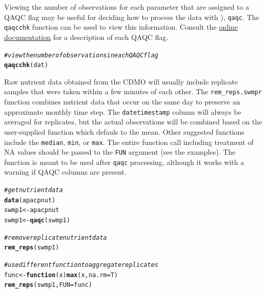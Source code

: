 \documentclass[10pt,letterpaper]{article}\usepackage[]{graphicx}\usepackage[]{color}
\makeatletter
\newcommand{\hlcom}[1]{\textcolor[rgb]{0.678,0.584,0.686}{\textit{#1}}}%
\newcommand{\hlstd}[1]{\textcolor[rgb]{0.345,0.345,0.345}{#1}}%
\newcommand{\hlkwa}[1]{\textcolor[rgb]{0.161,0.373,0.58}{\textbf{#1}}}%
\newcommand{\hlkwb}[1]{\textcolor[rgb]{0.69,0.353,0.396}{#1}}%
\newcommand{\hlkwc}[1]{\textcolor[rgb]{0.333,0.667,0.333}{#1}}%
\newcommand{\hlkwd}[1]{\textcolor[rgb]{0.737,0.353,0.396}{\textbf{#1}}}%
\newenvironment{kframe}{%
 \def\at@end@of@kframe{}%
 \ifinner\ifhmode%
  \def\at@end@of@kframe{\end{minipage}}%
  \begin{minipage}{\columnwidth}%
 \fi\fi%
 \def\FrameCommand##1{\hskip\@totalleftmargin \hskip-\fboxsep
 \colorbox{shadecolor}{##1}\hskip-\fboxsep
     \hskip-\linewidth \hskip-\@totalleftmargin \hskip\columnwidth}%
 \MakeFramed {\advance\hsize-\width
   \@totalleftmargin\z@ \linewidth\hsize
   \@setminipage}}%
 {\par\unskip\endMakeFramed%
 \at@end@of@kframe}
\newenvironment{knitrout}{}{} %
\makeatother
\begin{document}
Viewing the number of observations for each parameter that are assigned to a \ac{QAQC} flag may be useful for deciding how to process the data with ), \texttt{qaqc}.  The \texttt{qaqcchk} function can be used to view this information.  Consult the \href{http://cdmo.baruch.sc.edu/data/qaqc.cfm}{online documentation} for a description of each QAQC flag. 

\begin{knitrout}
\color{fgcolor}\begin{kframe}
\begin{alltt}
\hlcom{# view the number of observations in each QAQC flag}
\hlkwd{qaqcchk}\hlstd{(dat)}
\end{alltt}
\end{kframe}
\end{knitrout}

Raw nutrient data obtained from the \ac{CDMO} will usually include replicate samples that were taken within a few minutes of each other.  The \texttt{rem\_reps.swmpr} function combines nutrient data that occur on the same day to preserve an approximate monthly time step.  The \texttt{datetimestamp} column will always be averaged for replicates, but the actual observations will be combined based on the user-supplied function which defauls to the mean.  Other suggested functions include the \texttt{median}, \texttt{min}, or \texttt{max}.  The entire function call including treatment of NA values should be passed to the \texttt{FUN} argument (see the examples).  The function is meant to be used after \texttt{qaqc} processing, although it works with a warning if QAQC columns are present.

\begin{knitrout}
\color{fgcolor}\begin{kframe}
\begin{alltt}
\hlcom{# get nutrient data}
\hlkwd{data}\hlstd{(apacpnut)}
\hlstd{swmp1} \hlkwb{<-} \hlstd{apacpnut}
\hlstd{swmp1} \hlkwb{<-} \hlkwd{qaqc}\hlstd{(swmp1)}

\hlcom{# remove replicate nutrient data}
\hlkwd{rem_reps}\hlstd{(swmp1)}

\hlcom{# use different function to aggregate replicates}
\hlstd{func} \hlkwb{<-} \hlkwa{function}\hlstd{(}\hlkwc{x}\hlstd{)} \hlkwd{max}\hlstd{(x,} \hlkwc{na.rm} \hlstd{= T)}
\hlkwd{rem_reps}\hlstd{(swmp1,} \hlkwc{FUN} \hlstd{= func)}
\end{alltt}
\end{kframe}
\end{knitrout}
\end{document}
